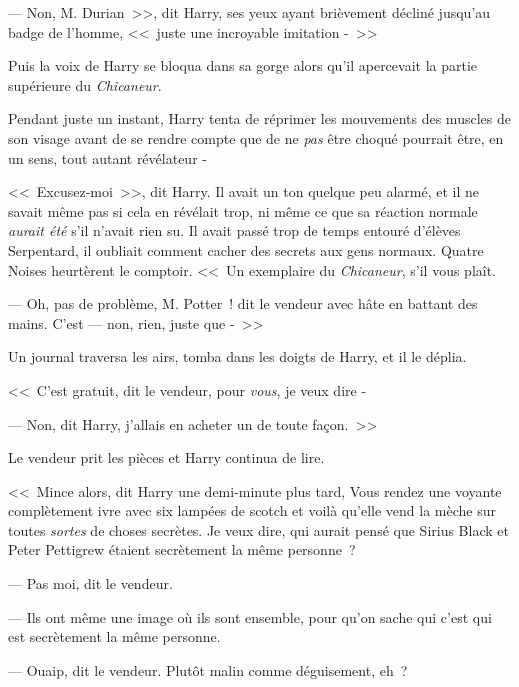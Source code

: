 --- Non, M. Durian~>>, dit Harry, ses yeux ayant brièvement décliné jusqu'au badge de l'homme, <<~juste une incroyable imitation -~>>

Puis la voix de Harry se bloqua dans sa gorge alors qu'il apercevait la partie supérieure du \emph{Chicaneur}.

Pendant juste un instant, Harry tenta de réprimer les mouvements des muscles de son visage avant de se rendre compte que de ne \emph{pas} être choqué pourrait être, en un sens, tout autant révélateur -

<<~Excusez-moi~>>, dit Harry. Il avait un ton quelque peu alarmé, et il ne savait même pas si cela en révélait trop, ni même ce que sa réaction normale \emph{aurait été} s'il n'avait rien su. Il avait passé trop de temps entouré d'élèves Serpentard, il oubliait comment cacher des secrets aux gens normaux. Quatre Noises heurtèrent le comptoir. <<~Un exemplaire du \emph{Chicaneur}, s'il vous plaît.

--- Oh, pas de problème, M. Potter~! dit le vendeur avec hâte en battant des mains. C'est — non, rien, juste que -~>>

Un journal traversa les airs, tomba dans les doigts de Harry, et il le déplia.


<<~C'est gratuit, dit le vendeur, pour \emph{vous}, je veux dire -

--- Non, dit Harry, j'allais en acheter un de toute façon.~>>

Le vendeur prit les pièces et Harry continua de lire.

<<~Mince alors, dit Harry une demi-minute plus tard, Vous rendez une voyante complètement ivre avec six lampées de scotch et voilà qu'elle vend la mèche sur toutes \emph{sortes} de choses secrètes. Je veux dire, qui aurait pensé que Sirius Black et Peter Pettigrew étaient secrètement la même personne~?

--- Pas moi, dit le vendeur.

--- Ils ont même une image où ils sont ensemble, pour qu'on sache qui c'est qui est secrètement la même personne.

--- Ouaip, dit le vendeur. Plutôt malin comme déguisement, eh~?

